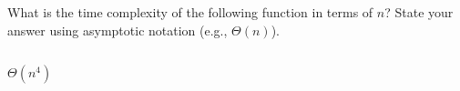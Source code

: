 \begin{prob}
    What is the time complexity of the following function in terms of $n$?
    State your answer using asymptotic notation (e.g., $\Theta(n)$).

    \inputminted{python}{./code.py}

    \begin{soln}
        $\Theta(n^4)$
    \end{soln}

\end{prob}
